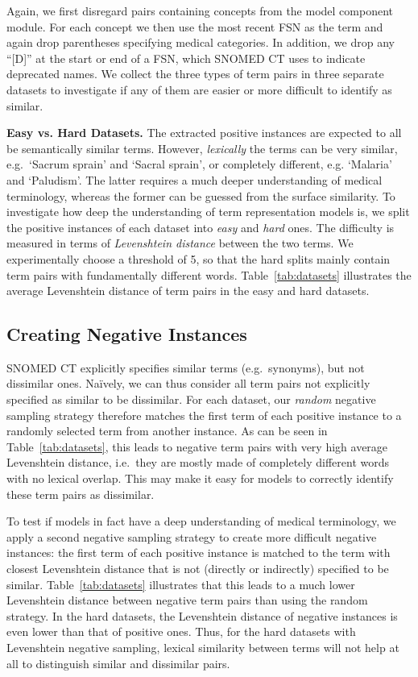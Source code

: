 \documentclass[letterpaper]{article} %
\newcommand{\lab}[1]{`#1'}
\begin{document}
Again, we first disregard pairs containing concepts from the model component module.
For each concept we then use the most recent FSN as the term and again drop parentheses specifying medical categories. In addition, we drop any ``[D]'' at the start or end of a FSN, which SNOMED CT uses to indicate deprecated names.
We collect the three types of term pairs in three separate datasets to investigate if any of them are easier or more difficult to identify as similar. 

\noindent \textbf{Easy vs. Hard Datasets.}
The extracted positive instances are expected to all be semantically similar terms. However,  \emph{lexically} the terms can be very similar, e.g.~\lab{Sacrum sprain} and \lab{Sacral sprain}, or completely different, e.g. \lab{Malaria} and \lab{Paludism}.
The latter requires a much deeper understanding of medical terminology, whereas the former can be guessed from the surface similarity.
To investigate how deep the understanding of term representation models is, we split the positive instances of each dataset into \emph{easy} and \emph{hard} ones.
The difficulty is measured in terms of \emph{Levenshtein distance} between the two terms.
We experimentally choose a threshold of 5, so that the hard splits mainly contain term pairs with fundamentally different words.
Table~\ref{tab:datasets} illustrates the average Levenshtein distance of term pairs in the easy and hard datasets.

\subsection{Creating Negative Instances}
SNOMED CT explicitly specifies similar terms (e.g.~synonyms), but not dissimilar ones.
Na\"{i}vely, we can thus consider all term pairs not explicitly specified as similar to be dissimilar.
For each dataset, our \emph{random} negative sampling strategy therefore matches the first term of each positive instance to a randomly selected term from another instance.
As can be seen in Table~\ref{tab:datasets}, this leads to negative term pairs with very high average Levenshtein distance, i.e.~they are mostly made of completely different words with no lexical overlap. This may make it easy for models to correctly identify these term pairs as dissimilar.

To test if models in fact have a deep understanding of medical terminology, we apply a second negative sampling strategy to create more difficult negative instances:
the first term of each positive instance is matched to the term with closest Levenshtein distance that is not (directly or indirectly) specified to be similar.
Table~\ref{tab:datasets} illustrates that this leads to a much lower Levenshtein distance between negative term pairs than using the random strategy. In the hard datasets, the Levenshtein distance of negative instances is even lower than that of positive ones. Thus, for the hard datasets with Levenshtein negative sampling, lexical similarity between terms will not help at all to distinguish similar and dissimilar pairs.
\end{document}
